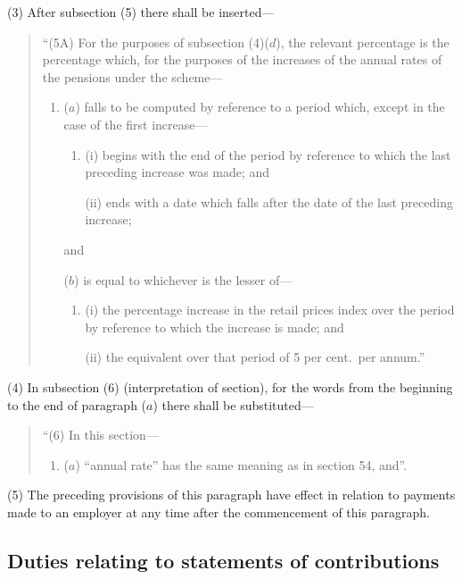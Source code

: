 \documentclass[12pt,a4paper]{article}
\begin{document}
(3) After subsection (5)  there shall be inserted—
\begin{quotation}
“(5A) For the purposes of subsection (4)($d$), the relevant percentage is the percentage which, for the purposes of the increases of the annual rates of the pensions under the scheme—
\begin{enumerate}\item[]
($a$) falls to be computed by reference to a period which, except in the case of the first increase—
\begin{enumerate}\item[]
(i) begins with the end of the period by reference to which the last preceding increase was made; and

(ii) ends with a date which falls after the date of the last preceding increase;
\end{enumerate}
and

($b$) is equal to whichever is the lesser of—
\begin{enumerate}\item[]
(i) the percentage increase in the retail prices index over the period by reference to which the increase is made; and

(ii) the equivalent over that period of 5 per cent.\ per annum.”
\end{enumerate}
\end{enumerate}
\end{quotation}

(4) In subsection (6)  (interpretation of section), for the words from the beginning to the end of paragraph ($a$)  there shall be substituted—
\begin{quotation}
“(6) In this section—
\begin{enumerate}\item[]
($a$) “annual rate” has the same meaning as in section 54, and”.
\end{enumerate}
\end{quotation}

(5) The preceding provisions of this paragraph have effect in relation to payments made to an employer at any time after the commencement of this paragraph.

\subsection*{Duties relating to statements of contributions}
\end{document}
